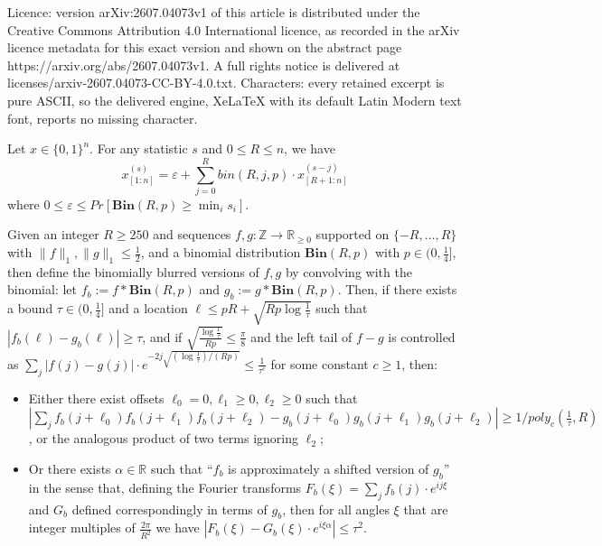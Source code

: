 \documentclass[10pt,a4paper]{amsart}
\newcommand{\Bin}[2]{\textbf{Bin}(#1,#2)}
\newcommand{\eps}{\varepsilon}
\begin{document}
Licence: version arXiv:2607.04073v1 of this article is distributed under the Creative Commons Attribution 4.0 International licence, as recorded in the arXiv licence metadata for this exact version and shown on the abstract page https://arxiv.org/abs/2607.04073v1. A full rights notice is delivered at licenses/arxiv-2607.04073-CC-BY-4.0.txt. Characters: every retained excerpt is pure ASCII, so the delivered engine, XeLaTeX with its default Latin Modern text font, reports no missing character.
\begin{lemma}\label{lem:binomial-shift} Let $x \in \{0,1\}^n$. For any statistic $s$ and $0 \leq R \leq n$, we have
\[x_{[1:n]}^{(s)}=\eps+\sum_{j=0}^{R} bin(R,j,p) \cdot x_{[R+1:n]}^{(s-j)}\]
where $0\leq \eps\leq Pr[\Bin{R}{p}\geq \min_i s_i]$.
\end{lemma}

\begin{lemma}\label{lem:combined-contrapositive}
Given an integer $R\geq 250$ and sequences $f,g:\mathbb{Z}\rightarrow\mathbb{R}_{\geq 0}$ supported on $\{-R,\ldots,R\}$ with $\|f\|_1,\|g\|_1\leq \frac{1}{2}$, and a binomial distribution $\Bin{R}{p}$ with $p\in (0,\frac{1}{4}]$, then define the binomially blurred versions of $f,g$ by convolving with the binomial: let $f_b:=f\ast \Bin{R}{p}$ and $g_b:=g\ast \Bin{R}{p}$. Then, if there exists a bound $\tau\in (0,\frac{1}{4}]$ and a location $\ell\leq pR+\sqrt{Rp\log\frac{1}{\tau}}$  such that $|f_b(\ell)-g_b(\ell)|\geq\tau$, and if $\sqrt{\frac{\log\frac{1}{\tau}}{Rp}}\leq \frac{\pi}{8}$ and the left tail of $f-g$ is controlled as $\sum_j |f(j)-g(j)|\cdot e^{-2j\sqrt{(\log\frac{1}{\tau})/(Rp)}}\leq \frac{1}{\tau^c}$ for some constant $c\geq 1$, then: 
\begin{itemize}
    \item[\textup{1)}] Either there exist offsets $\ell_0=0,\ell_1\geq 0,\ell_2\geq 0$ such that $|\sum_j f_b(j+\ell_0)f_b(j+\ell_1)f_b(j+\ell_2)-g_b(j+\ell_0)g_b(j+\ell_1)g_b(j+\ell_2)|\geq 1/poly_c(\frac{1}{\tau},R)$, or the analogous product of two terms ignoring $\ell_2$;
    \item[\textup{2)}] Or there exists $\alpha\in\mathbb{R}$ such that ``$f_b$ is approximately a shifted version of $g_b$'' in the sense that, defining the Fourier transforms $F_b(\xi)=\sum_j f_b(j)\cdot  e^{ij\xi}$ and $G_b$ defined correspondingly in terms of $g_b$, then for all angles $\xi$ that are integer multiples of $\frac{2\pi}{R^2}$ we have $|F_b(\xi)-G_b(\xi)\cdot e^{i\xi \alpha}|\leq \tau^2$.
\end{itemize}

\end{lemma}
\end{document}
